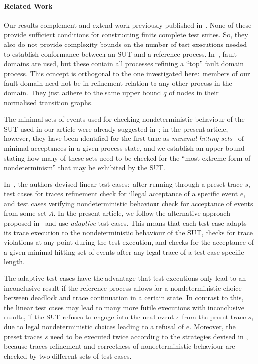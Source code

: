 \paragraph{Related Work}
Our results complement and extend work previously published
in~\cite{Hennessy:1988:ATP:50497,DBLP:conf/fm/PeleskaS96,peleska1997a,DBLP:conf/icfem/CavalcantiG07,DBLP:conf/pts/CavalcantiS17}.
None of these provide sufficient conditions for constructing finite complete
test suites. So, they also do not provide complexity bounds on the number of
test executions needed to establish conformance between an SUT and a
reference process. In~\cite{DBLP:conf/pts/CavalcantiS17}, fault domains are
used, but these contain all processes refining a ``top'' fault domain
process. This concept is orthogonal to the one investigated here:~members of
our fault domain need not be in refinement relation to any other process in
the domain. They just adhere to the same upper bound $q$ of nodes in their
normalised transition graphs.

The minimal sets of events used for checking nondeterministic behaviour of the SUT used in our article were already suggested in~\cite{DBLP:conf/fm/PeleskaS96,peleska1997a,DBLP:conf/icfem/CavalcantiG07}; in the present article, however, they have been identified for the first time as {\it minimal hitting sets}~\cite{5533149} of minimal acceptances in a given process state, and we establish an upper bound stating how many of these sets need to be checked for the ``most extreme form of nondeterminism'' that may be exhibited by the SUT.

In~\cite{Hennessy:1988:ATP:50497,DBLP:conf/icfem/CavalcantiG07,DBLP:conf/pts/CavalcantiS17},
the authors devised linear test cases:~after running through a preset trace
$s$, test cases for traces refinement check for illegal acceptance of a
specific event $e$, and test cases verifying  nondeterministic behaviour
check for  acceptance of events from some set $A$. In the present article, we
follow the alternative approach proposed
in~\cite{DBLP:conf/fm/PeleskaS96,peleska1997a} and use {\it adaptive} test
cases. This means that each test case adapts its trace execution to the
nondeterministic behaviour of the SUT, checks for trace violations at any
point during the test execution, and checks for the acceptance of a given
minimal hitting set of events after any legal trace of a test case-specific
length.

The adaptive test cases have the advantage that test executions only lead to
an inconclusive result if the reference process allows for a nondeterministic
choice between deadlock and trace continuation in a certain state. In
contrast to this, the linear test cases may lead to many more futile
executions with inconclusive results, if the SUT refuses to engage into the
next event $e$ from the preset trace $s$, due to legal nondeterministic
choices leading to a refusal of $e$. Moreover, the preset traces $s$ need to
be executed twice according to the strategies devised in
\cite{Hennessy:1988:ATP:50497,DBLP:conf/icfem/CavalcantiG07,DBLP:conf/pts/CavalcantiS17},
because traces refinement and correctness of nondeterministic behaviour are
checked by two different sets of test cases.

